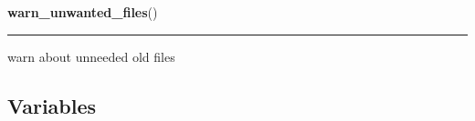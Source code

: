     \vspace{0.5ex}

\hspace{.8\funcindent}\begin{boxedminipage}{\funcwidth}

    \raggedright \textbf{warn\_unwanted\_files}()

    \vspace{-1.5ex}

    \rule{\textwidth}{0.5\fboxrule}
\setlength{\parskip}{2ex}
    warn about unneeded old files

\setlength{\parskip}{1ex}
    \end{boxedminipage}



  \subsection{Variables}


